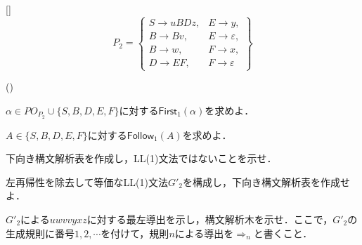 \documentclass[dvipdfmx]{jarticle}
\newcounter{coffee}
\newcounter{bean}
\begin{document}
\begin{list}{[]}{}
        \[P_2=\left\{\begin{array}{ll}
            S\rightarrow uBDz , & E\rightarrow y          , \\
            B\rightarrow Bv   , & E\rightarrow\varepsilon , \\
            B\rightarrow w    , & F\rightarrow x          , \\
            D\rightarrow EF   , & F\rightarrow\varepsilon
          \end{array}\right\}\]

        \begin{list}{()}{}
          \item $\alpha\in PO_{P_2}\cup\{S,B,D,E,F\}$に対する$\mathsf{First}_1(\alpha)$を求めよ．
          \item $A\in\{S,B,D,E,F\}$に対する$\mathsf{Follow}_1(A)$を求めよ．
          \item 下向き構文解析表を作成し，LL(1)文法ではないことを示せ．
          \item 左再帰性を除去して等価なLL(1)文法$G'_2$を構成し，下向き構文解析表を作成せよ．
          \item $G'_2$による$uwvvyxz$に対する最左導出を示し，構文解析木を示せ．ここで，$G'_2$の生成規則に番号$1,2,\cdots$を付けて，規則$n$による導出を${\Rightarrow}_{n}$と書くこと．
        \end{list}
\end{list}
\end{document}
